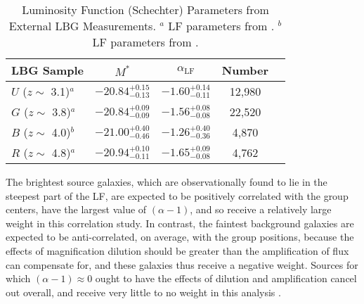 \documentclass[iop]{emulateapj}
\begin{document}
\begin{table}
  \begin{center}

   \caption{Luminosity Function (Schechter) Parameters from External LBG Measurements. $^a$ LF parameters from \protect \citet{vanderBurg10}. $^b$ LF parameters from \protect \citet{Sawicki06}.}
 \label{LFtable}
    \begin{tabular}{lcccl}
      \hline \hline
      LBG Sample & $M^*$ & $\alpha_{\text{LF}}$ & Number \\ \hline
      $U$ ($z \sim$ 3.1)$^a$ & $-20.84^{+0.15}_{-0.13}$ & $-1.60^{+0.14}_{-0.11}$ & 12,980 \\
      $G$ ($z \sim$ 3.8)$^a$ & $-20.84^{+0.09}_{-0.09}$ & $-1.56^{+0.08}_{-0.08}$ & 22,520 \\
      $B$ ($z \sim$ 4.0)$^b$ & $-21.00^{+0.40}_{-0.46}$ & $-1.26^{+0.40}_{-0.36}$ & 4,870 \\ 
      $R$ ($z \sim$ 4.8)$^a$ & $-20.94^{+0.10}_{-0.11}$ & $-1.65^{+0.09}_{-0.08}$ & 4,762 \\
      \hline
    \end{tabular}
  \end{center}
\end{table}


The brightest source galaxies, which are observationally found to lie in the steepest part of the LF, are expected to be positively correlated with the group centers, have the largest value of $(\alpha-1)$, and so receive a relatively large weight in this correlation study. In contrast, the faintest background galaxies are expected to be anti-correlated, on average, with the group positions, because the effects of magnification dilution should be greater than the amplification of flux can compensate for, and these galaxies thus receive a negative weight. Sources for which $(\alpha-1) \approx 0$ ought to have the effects of dilution and amplification cancel out overall, and receive very little to no weight in this analysis \citep{Scranton05}. 
\end{document}
